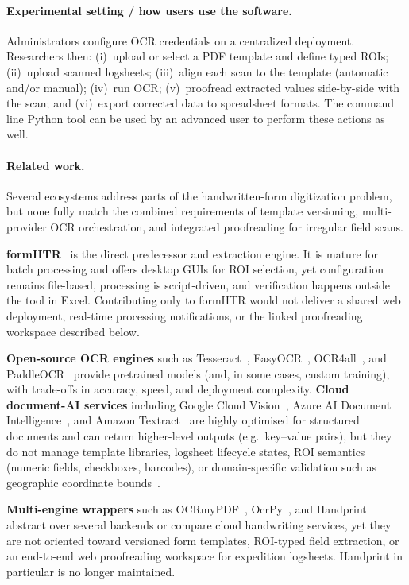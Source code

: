 \documentclass[preprint,12pt,a4paper]{elsarticle}
\begin{document}
\paragraph{Experimental setting / how users use the software.}
Administrators configure OCR credentials on a centralized deployment.
Researchers then: (i)~upload or select a PDF template and define typed ROIs; (ii)~upload scanned logsheets; (iii)~align each scan to the template (automatic and/or manual); (iv)~run OCR; (v)~proofread extracted values side-by-side with the scan; and (vi)~export corrected data to spreadsheet formats. The command line Python tool can be used by an advanced user to perform these actions as well.

\paragraph{Related work.}
Several ecosystems address parts of the handwritten-form digitization problem, but none fully match the combined requirements of template versioning, multi-provider OCR orchestration, and integrated proofreading for irregular field scans.

\textbf{formHTR}~\cite{formHTR_repo} is the direct predecessor and extraction engine.
It is mature for batch processing and offers desktop GUIs for ROI selection, yet configuration remains file-based, processing is script-driven, and verification happens outside the tool in Excel.
Contributing only to formHTR would not deliver a shared web deployment, real-time processing notifications, or the linked proofreading workspace described below.

\textbf{Open-source OCR engines} such as Tesseract~\cite{tesseract_ocr}, EasyOCR~\cite{easyocr}, OCR4all~\cite{app9224853}, and PaddleOCR~\cite{cui2025paddleocr30technicalreport} provide pretrained models (and, in some cases, custom training), with trade-offs in accuracy, speed, and deployment complexity.
\textbf{Cloud document-AI services} including Google Cloud Vision~\cite{google_vision_api}, Azure AI Document Intelligence~\cite{azure_form_recognizer}, and Amazon Textract~\cite{amazon_textract} are highly optimised for structured documents and can return higher-level outputs (e.g.\ key--value pairs), but they do not manage template libraries, logsheet lifecycle states, ROI semantics (numeric fields, checkboxes, barcodes), or domain-specific validation such as geographic coordinate bounds~\cite{metaTREC_curation}.

\textbf{Multi-engine wrappers} such as OCRmyPDF~\cite{ocrmypdf}, OcrPy~\cite{ocrpy}, and Handprint~\cite{handprint} abstract over several backends or compare cloud handwriting services, yet they are not oriented toward versioned form templates, ROI-typed field extraction, or an end-to-end web proofreading workspace for expedition logsheets.
Handprint in particular is no longer maintained.
\end{document}
